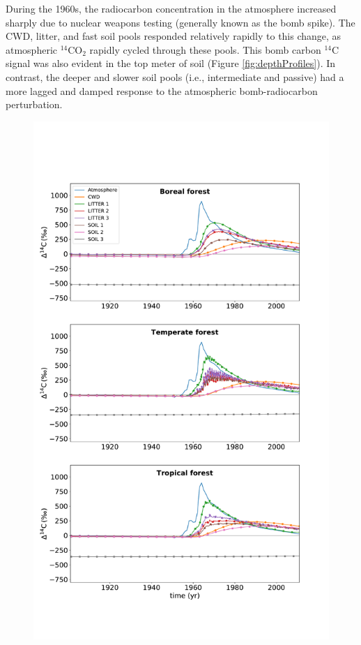 \documentclass[draft]{agujournal2019}
\begin{document}
During the 1960s, the radiocarbon concentration in the atmosphere increased sharply due to nuclear weapons testing (generally known as the bomb spike). The CWD, litter, and fast soil pools responded relatively rapidly to this change, as atmospheric $^{14}$CO$_2$ rapidly cycled through these pools. This bomb carbon $^{14}$C signal was also evident in the top meter of soil (Figure \ref{fig:depthProfiles}). In contrast, the deeper and slower soil pools (i.e., intermediate and passive) had a more lagged and damped response to the atmospheric bomb-radiocarbon perturbation.

\begin{figure}[htbp]
        \centering 
        \vspace{-8em}
        \includegraphics[width=0.9\linewidth]{figs/Delta_14C_through_time_per_pools_10.pdf}

\end{figure}
\end{document}

